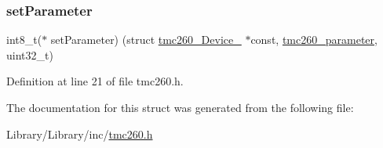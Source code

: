 \subsubsection{\texorpdfstring{set\+Parameter}{setParameter}}
{\footnotesize\ttfamily int8\+\_\+t($\ast$  set\+Parameter) (struct \mbox{\hyperlink{structtmc260___device__}{tmc260\+\_\+\+Device\+\_\+}} $\ast$const, \mbox{\hyperlink{tmc260_8h_af9376d3cf645591c7044d834be46c514}{tmc260\+\_\+parameter}}, uint32\+\_\+t)}



Definition at line 21 of file tmc260.\+h.



The documentation for this struct was generated from the following file\+:\begin{DoxyCompactItemize}
\item 
Library/\+Library/inc/\mbox{\hyperlink{tmc260_8h}{tmc260.\+h}}\end{DoxyCompactItemize}
